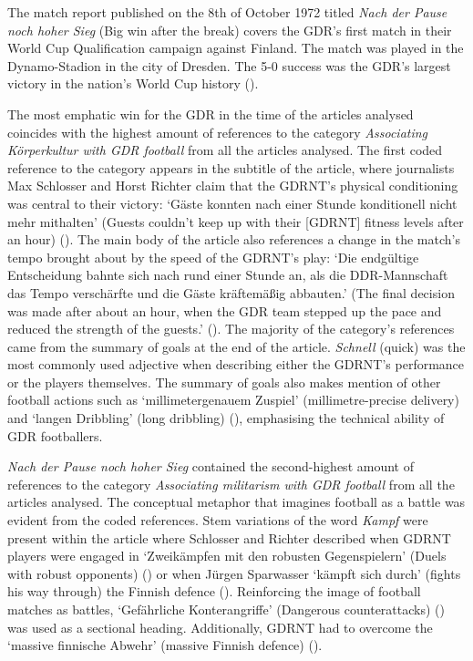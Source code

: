 The match report published on the 8th of October 1972 titled \textit{Nach der Pause noch hoher Sieg} (Big win after the break) covers the GDR’s first match in their World Cup Qualification campaign against Finland. The match was played in the Dynamo-Stadion in the city of Dresden. The 5-0 success was the GDR’s largest victory in the nation’s World Cup history (\cite{dähn2013}).

The most emphatic win for the GDR in the time of the articles analysed coincides with the highest amount of references to the category \textit{Associating Körperkultur with GDR football} from all the articles analysed. The first coded reference to the category appears in the subtitle of the article, where journalists Max Schlosser and Horst Richter claim that the GDRNT’s physical conditioning was central to their victory: ‘Gäste konnten nach einer Stunde konditionell nicht mehr mithalten’ (Guests couldn't keep up with their [GDRNT] fitness levels after an hour) (\cite{nd19721008}). The main body of the article also references a change in the match’s tempo brought about by the speed of the GDRNT’s play: ‘Die endgültige Entscheidung bahnte sich nach rund einer Stunde an, als die DDR-Mannschaft das Tempo verschärfte und die Gäste kräftemäßig abbauten.’ (The final decision was made after about an hour, when the GDR team stepped up the pace and reduced the strength of the guests.’ (\cite{nd19721008}). The majority of the category’s references came from the summary of goals at the end of the article. \textit{Schnell} (quick) was the most commonly used adjective when describing either the GDRNT’s performance or the players themselves. The summary of goals also makes mention of other football actions such as ‘millimetergenauem Zuspiel’ (millimetre-precise delivery) and ‘langen Dribbling’ (long dribbling) (\cite{nd19721008}), emphasising the technical ability of GDR footballers.

\textit{Nach der Pause noch hoher Sieg} contained the second-highest amount of references to the category \textit{Associating militarism with GDR football} from all the articles analysed. The conceptual metaphor that imagines football as a battle was evident from the coded references. Stem variations of the word \textit{Kampf} were present within the article where Schlosser and Richter described when GDRNT players were engaged in ‘Zweikämpfen mit den robusten Gegenspielern’ (Duels with robust opponents) (\cite{nd19721008}) or when Jürgen Sparwasser ‘kämpft sich durch’ (fights his way through) the Finnish defence (\cite{nd19721008}). Reinforcing the image of football matches as battles, ‘Gefährliche Konterangriffe’ (Dangerous counterattacks) (\cite{nd19721008}) was used as a sectional heading. Additionally, GDRNT had to overcome the ‘massive finnische Abwehr’ (massive Finnish defence) (\cite{nd19721008}).

